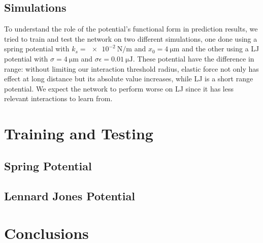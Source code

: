 \documentclass[../../master_thesis_np.tex]{subfiles}
\begin{document}

\subsection{Simulations}
To understand the role of the potential's functional form in prediction results, we tried to train and test the network on two different simulations, one done using a spring potential with $k_s = \SI{e-2}{\newton\per\meter}$ and $x_0 = \SI{4}{\um}$ and the other using a LJ potential with $\sigma = \SI{4}{\um}$ and $\sigma\epsilon = \SI{0.01}{\micro\joule}$.
These potential have the difference in range: without limiting our interaction threshold radius, elastic force not only has effect at long distance but its absolute value increases, while LJ is a short range potential.
We expect the network to perform worse on LJ since it has less relevant interactions to learn from.

\section{Training and Testing}
\subsection{Spring Potential}
\subsection{Lennard Jones Potential}
\section{Conclusions}
\end{document}
